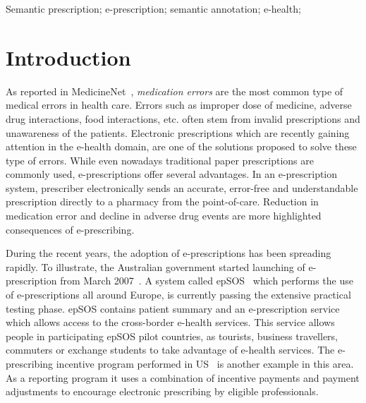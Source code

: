 \documentclass[10pt, conference, compsocconf]{IEEEtran}
\begin{document}
\begin{IEEEkeywords}
 Semantic prescription; e-prescription; semantic annotation; e-health;

\end{IEEEkeywords}


\IEEEpeerreviewmaketitle



\section{Introduction}
\label{intro}

As reported in MedicineNet~\cite{medicationErrors}, \emph{medication errors} are the most common type of medical errors in health care.
Errors such as improper dose of medicine, adverse drug interactions, food interactions, etc. often stem from invalid prescriptions and unawareness of the patients.
Electronic prescriptions which are recently gaining attention in the e-health domain, are one of the solutions proposed to solve these type of errors.
While even nowadays traditional paper prescriptions are commonly used, e-prescriptions offer several advantages.
In an e-prescription system, prescriber electronically sends an accurate, error-free and understandable prescription directly to a pharmacy from the point-of-care.
Reduction in medication error and decline in adverse drug events are more highlighted consequences of e-prescribing.

During the recent years, the adoption of e-prescriptions has been spreading rapidly.
To illustrate, the Australian government started launching of e-prescription from March 2007~\cite{medicare}.
A system called epSOS~\cite{epsos} which performs the use of e-prescriptions all around Europe, is currently passing the extensive practical testing phase.
epSOS contains patient summary and an e-prescription service which allows access to the cross-border e-health services.
This service allows people in participating epSOS pilot countries, as tourists, business travellers, commuters or exchange students to take advantage of e-health services.
The e-prescribing incentive program performed in US~\cite{epincentive} is another example in this area.
As a reporting program it uses a combination of incentive payments and payment adjustments to encourage electronic prescribing by eligible professionals.
\end{document}
